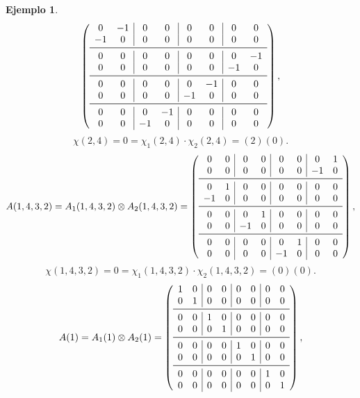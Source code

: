 \documentclass[12pt]{book}
\theoremstyle{definition}
\newtheorem{example}[theorem]{Ejemplo}
\newcounter{in}
\begin{document}
\begin{example}
\[\left( \begin{array}{cc|cc|cc|cc}
 0 & -1 &  0 &  0 &  0 &  0 &  0 &  0  \\
-1 &  0 &  0 &  0 &  0 &  0 &  0 &  0  \\
\midrule
 0 &  0 &  0 &  0 &  0 &  0 &  0 & -1  \\
 0 &  0 &  0 &  0 &  0 &  0 & -1 &  0  \\
\midrule
 0 &  0 &  0 &  0 &  0 & -1 &  0 &  0  \\
 0 &  0 &  0 &  0 & -1 &  0 &  0 &  0  \\
\midrule
 0 &  0 &  0 & -1 &  0 &  0 &  0 &  0  \\
 0 &  0 & -1 &  0 &  0 &  0 &  0 &  0  \\
\end{array}\right),
\]
$$\chi(2, 4)= 0 = \chi_{1}(2, 4) \cdot \chi_{2}(2, 4) = (2)(0). $$
\[
A(1, 4, 3, 2) = A_{1}(1, 4, 3, 2) \otimes A_{2}(1, 4, 3, 2) =
\left( \begin{array}{cc|cc|cc|cc}
0 & 0 &  0 & 0 &  0 & 0 &  0 & 1  \\
 0 & 0 &  0 & 0 &  0 & 0 & -1 & 0  \\
\midrule
 0 & 1 &  0 & 0 &  0 & 0 &  0 & 0  \\
-1 & 0 &  0 & 0 &  0 & 0 &  0 & 0  \\
\midrule
 0 & 0 &  0 & 1 &  0 & 0 &  0 & 0  \\
 0 & 0 & -1 & 0 &  0 & 0 &  0 & 0  \\
\midrule
 0 & 0 &  0 & 0 &  0 & 1 &  0 & 0  \\
 0 & 0 &  0 & 0 & -1 & 0 &  0 & 0  \\ 
\end{array}\right),
\]
$$\chi(1, 4, 3, 2)= 0 = \chi_{1}(1, 4, 3, 2) \cdot \chi_{2}(1, 4, 3, 2) = (0)(0). $$
\[
A(1) = A_{1}(1) \otimes A_{2}(1) =
\left( \begin{array}{cc|cc|cc|cc}
1 & 0 & 0 & 0 & 0 & 0 & 0 & 0  \\
0 & 1 & 0 & 0 & 0 & 0 & 0 & 0  \\
\midrule
0 & 0 & 1 & 0 & 0 & 0 & 0 & 0  \\
0 & 0 & 0 & 1 & 0 & 0 & 0 & 0  \\
\midrule
0 & 0 & 0 & 0 & 1 & 0 & 0 & 0  \\
0 & 0 & 0 & 0 & 0 & 1 & 0 & 0  \\
\midrule
0 & 0 & 0 & 0 & 0 & 0 & 1 & 0  \\
0 & 0 & 0 & 0 & 0 & 0 & 0 & 1 \\
\end{array}\right),
\]
\end{example}
\end{document}
